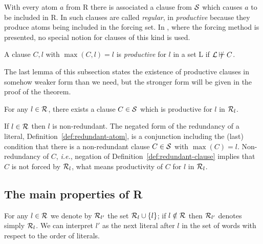 With every atom $a$ from \C R there is associated a clause from $\mbox {$\cal S$}$ which
causes $a$ to be included in \C R. In \cite{S-A} such clauses are called {\em
regular}, in \cite{BG} {\em productive} because they produce atoms being
included in the forcing set. In \cite{PP}, where the forcing method is presented,
no special notion for clauses of this kind is used.
\begin{DEFINITION} \label{def:productive}
A clause $C,l$ with $\max(C,l)=l$ is {\em productive} for $l$ in a set \C L 
if $\notforc{\C L}C$.
\end{DEFINITION}
The last lemma of this subsection 
states the existence of productive clauses in somehow weaker form than
we need, but the stronger form will be given in the proof of the theorem.

\begin{LEMMA} \label{le:productive-clause}
For any $l\in\mbox {$\cal R$}$, there exists a clause \(C\in\mbox {$\cal S$}\)
which is productive for $l$ in \(\mbox {$\cal R$}_l\).
\end{LEMMA}
\begin{PROOF}
 If $l\in \mbox {$\cal R$}$ then $l$ is non-redundant. The negated form of the redundancy
 of a literal, 
 Definition~\ref{def:redundant-atom}, is a conjunction including the (last)
 condition that there is a non-redundant clause $C\in \mbox {$\cal S$}$ with $\max(C)=l$.
 Non-redundancy of $C$, {\em i.e.}, negation of
 Definition~\ref{def:redundant-clause} implies that $C$ is not forced by \(\mbox {$\cal R$}_l\), what means productivity of $C$ for $l$ in \(\mbox {$\cal R$}_l\).
\end{PROOF}

\subsection{The main properties of \protect\C R} \label{se:main-R}
For any \(l\in\mbox {$\cal R$}\) we denote by \(\mbox {$\cal R$}_{l'}\) the set \(\mbox {$\cal R$}_l\cup\{l\}\);
if \(l\notin\mbox {$\cal R$}\) then $\mbox {$\cal R$}_{l'}$ denotes simply \(\mbox {$\cal R$}_l\).
We can interpret \(l'\)
as the next literal after \(l\) in the set of words with respect to the order 
of literals.

